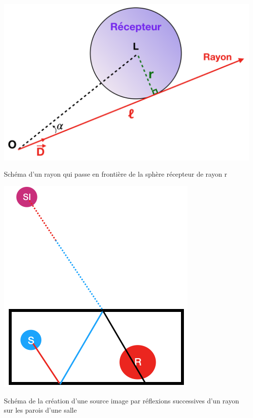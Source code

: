 \begin{figureth}
	\begin{subfigureth}{0.55\textwidth}
			\includegraphics[width=\linewidth]{images/touche}
			\caption{Schéma d'un rayon qui passe en frontière de la sphère récepteur de rayon r}
			\label{touche}
		\end{subfigureth}
		\qquad
		\begin{subfigureth}{0.35\textwidth}
			\includegraphics[width=\linewidth]{images/schema_SI}
			\caption{Schéma de la création d'une source image par réflexions successives d'un rayon sur les parois d'une salle}
			\label{schema_SI}
	\end{subfigureth}
\end{figureth}

